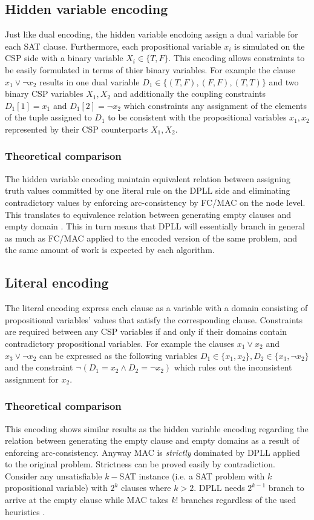 \subsection{Hidden variable encoding}
Just like dual encoding, the hidden variable encdoing assign a dual variable for each SAT clause. Furthermore, each propositional variable $x_i$ is simulated on the CSP side with a binary variable $X_i \in \{T,F\}$. This encoding allows constraints to be easily formulated in terms of thier binary variables. For example the clause $x_1 \vee \neg x_2$ results in one dual variable $D_1 \in \{(T,F),(F,F),(T,T)\}$ and two binary CSP variables $X_1, X_2$ and additionally the coupling constraints $D_1[1] = x_1$ and $D_1[2] = \neg x_2$ which constraints any assignment of the elements of the tuple assigned to $D_1$ to be consistent with the propositional variables $x_1,x_2$ represented by their CSP counterparts $X_1,X_2$.

\subsubsection{Theoretical comparison}
The hidden variable encoding maintain equivalent relation between assigning truth values committed by one literal rule on the DPLL side and eliminating contradictory values by enforcing arc-consistency by FC/MAC on the node level. This translates to equivalence relation between generating empty clauses and empty domain \cite{walsh2000sat}. This in turn means that DPLL will essentially branch in general as much as FC/MAC applied to the encoded version of the same problem, and the same amount of work is expected by each algorithm.

\subsection{Literal encoding}
The literal encoding express each clause as a variable with a domain consisting of propositional variables' values that satisfy the corresponding clause. Constraints are required between any CSP variables if and only if their domains contain contradictory propositional variables. For example the clauses $x_1 \vee x_2$ and $x_3 \vee \neg x_2$ can be expressed as the following variables $D_1 \in \{x_1, x_2\}, D_2 \in \{x_3, \neg x_2\}$ and the constraint $\neg (D_1 = x_2 \wedge D_2 = \neg x_2)$ which rules out the inconsistent assignment for $x_2$.

\subsubsection{Theoretical comparison}
This encoding shows similar results as the hidden variable encoding regarding the relation between generating the empty clause and empty domains as a result of enforcing arc-consistency. Anyway MAC is \textit{strictly} dominated by DPLL applied to the original problem. Strictness can be proved easily by contradiction. Consider any unsatisfiable $k-$SAT instance (i.e. a SAT problem with $k$ propositional variable) with $2^k$ clauses where $k > 2$. DPLL needs $2^{k-1}$ branch to arrive at the empty clause while MAC takes $k!$ branches regardless of the used heuristics \cite{walsh2000sat}.

